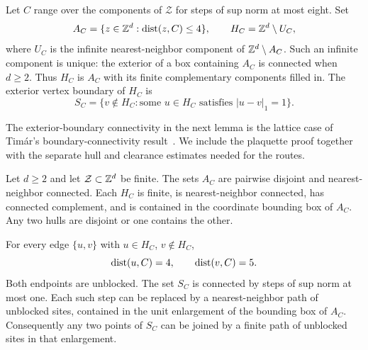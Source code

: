 Let $C$ range over the components of $\mathcal Z$ for steps of sup norm
at most eight.  Set
\[
 A_C=\{z\in\mathbb Z^d:\operatorname{dist}(z,C)\le4\},\qquad
 H_C=\mathbb Z^d\setminus U_C,
\]
where $U_C$ is the infinite nearest-neighbor component of
$\mathbb Z^d\setminus A_C$.  Such an infinite component is unique: the exterior
of a box containing $A_C$ is connected when $d\ge2$.  Thus $H_C$ is
$A_C$ with its finite complementary components filled in.  The exterior
vertex boundary of $H_C$ is
\[
 S_C=\{v\notin H_C:\text{some }u\in H_C\text{ satisfies }|u-v|_1=1\}.
\]

The exterior-boundary connectivity in the next lemma is the lattice case
of Tim\'ar's boundary-connectivity result~\cite[Lemmas~1--2]{Timar2013}.
We include the plaquette proof together with the separate hull and
clearance estimates needed for the routes.

\begin{lemma}\label{lem:hulls}
Let $d\ge2$ and let $\mathcal Z\subset\mathbb Z^d$ be finite.  The sets $A_C$
are pairwise disjoint and nearest-neighbor connected.  Each $H_C$ is finite,
is nearest-neighbor connected, has connected complement, and is contained
in the coordinate bounding box of $A_C$.  Any two hulls are disjoint or one
contains the other.

For every edge $\{u,v\}$ with $u\in H_C$, $v\notin H_C$,
\begin{equation}\label{eq:hull-clearance}
 \operatorname{dist}(u,C)=4,\qquad \operatorname{dist}(v,C)=5.
\end{equation}
Both endpoints are unblocked.  The set $S_C$ is connected by steps of sup
norm at most one.  Each such step can be replaced by a nearest-neighbor
path of unblocked sites, contained in the unit enlargement of the bounding
box of $A_C$.  Consequently any two points of $S_C$ can be joined by a
finite path of unblocked sites in that enlargement.
\end{lemma}

